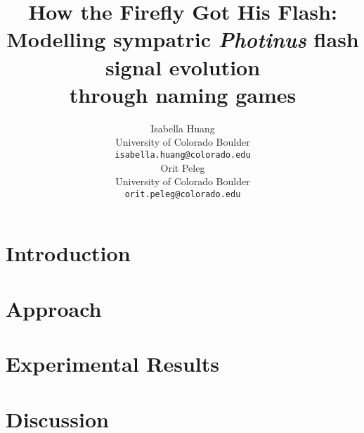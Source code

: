 \documentclass[11pt,a4paper]{article}
\title{How the Firefly Got His Flash: \\Modelling sympatric {\it Photinus} flash signal evolution\\through naming games}
\author{Isabella Huang \\
  University of Colorado Boulder \\
  {\tt isabella.huang@colorado.edu} \\\And
  Orit Peleg \\
  University of Colorado Boulder \\
  {\tt orit.peleg@colorado.edu} \\}
\date{}
\newcommand{\includesection}[2]{\section{#2} \label{sec:#1} }
\begin{document}
\maketitle

%  


\includesection{intro      }{Introduction}
\includesection{approach   }{Approach}
\includesection{results}{Experimental Results}
\includesection{discussion }{Discussion}




\end{document}
